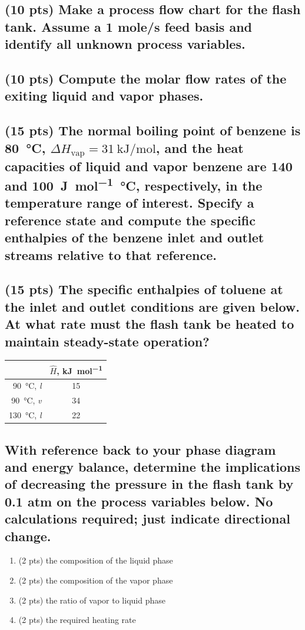 \documentclass[11pt]{article}
\begin{document}
\subsection{(10 pts) Make a process flow chart for the flash tank.  Assume a 1 mole/s feed basis and identify all unknown process variables.}
\label{sec-4-4}
\newpage
\subsection{(10 pts) Compute the molar flow rates of the exiting liquid and vapor phases.}
\label{sec-4-5}
\newpage
\subsection{(15 pts) The normal boiling point of benzene is \SI{80}{\celsius}, \(\Delta H_{\text{vap}} = \SI{31}{\kilo\joule\per\mole}\), and the heat capacities of liquid and vapor benzene are 140 and \SI{100}{\joule\per\mole\celsius}, respectively, in the temperature range of interest.  Specify a reference state and compute the specific enthalpies of the benzene inlet and outlet streams relative to that reference.}
\label{sec-4-6}
\newpage
\subsection{(15 pts) The specific enthalpies of toluene at the inlet and outlet conditions are given below.  At what rate must the flash tank be heated to maintain steady-state operation?}
\label{sec-4-7}

\begin{center}
\begin{tabular}{rc}
\hline
 & \(\hat{H}\), \si{\kilo\joule\per\mole}\\
\hline
\SI{90}{\celsius}, \emph{l} & 15\\
\SI{90}{\celsius}, \emph{v} & 34\\
\SI{130}{\celsius}, \emph{l} & 22\\
\hline
\end{tabular}
\end{center}
\vspace{10cm}
\subsection{With reference back to your phase diagram and energy balance, determine  the implications of decreasing the pressure in the flash tank by 0.1 atm on the process variables below.  No calculations required; just indicate directional change.}
\label{sec-4-8}
\begin{enumerate}
\item (2 pts) the composition of the liquid phase
\label{sec-4-8-1}
\vspace{1cm}
\item (2 pts) the composition of the vapor phase
\label{sec-4-8-2}
\vspace{1cm}
\item (2 pts) the ratio of vapor to liquid phase
\label{sec-4-8-3}
\vspace{1cm}
\item (2 pts) the required heating rate
\label{sec-4-8-4}
\newpage
\end{enumerate}
\end{document}
